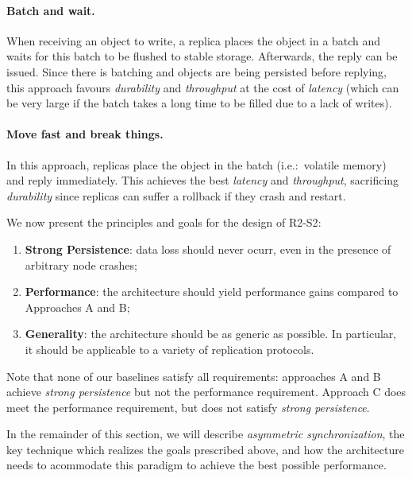 \paragraph{Batch and wait.} When receiving an object to write, a
replica places the object in a batch and waits for this batch to
be flushed to stable storage. Afterwards, the reply can be
issued. Since there is batching and objects are being persisted
before replying, this approach favours \emph{durability} and
\emph{throughput} at the cost of \emph{latency} (which can be
very large if the batch takes a long time to be filled due to a
lack of writes).

\paragraph{Move fast and break things.} In this approach,
replicas place the object in the batch (i.e.:\ volatile memory)
and reply immediately. This achieves the best \emph{latency} and
\emph{throughput}, sacrificing \emph{durability} since replicas
can suffer a rollback if they crash and restart.

We now present the principles and goals for the design of
\ac{R2-S2}:
\begin{enumerate}
    \item \textbf{Strong Persistence}: data loss should never
        ocurr, even in the presence of arbitrary node crashes;

    \item \textbf{Performance}: the architecture should yield
        performance gains compared to
        Approaches A and B\@;
    \item \textbf{Generality}: the architecture should be as
        generic as possible. In particular, it should be
        applicable to a variety of replication protocols.
\fi
\end{enumerate}

Note that none of our baselines satisfy all requirements:
approaches A and B achieve
\emph{strong persistence} but not the performance requirement.
Approach C does meet the performance
requirement, but does not satisfy \emph{strong persistence}.

In the remainder of this section, we will describe
\emph{asymmetric synchronization}, the key technique which realizes the
goals prescribed above, and how the architecture needs to
acommodate this paradigm to achieve the best possible
performance.

